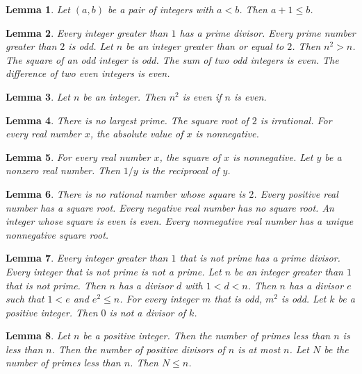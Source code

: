 \documentclass{article}
\newtheorem{lemma}{Lemma}
\begin{document}
\begin{lemma}\label{pair}
Let $(a,b)$ be a pair of integers with $a<b$. Then $a+1\le b$.
\end{lemma}

\begin{lemma}\label{comparatives-and-sums}
Every integer greater than $1$ has a prime divisor. Every prime number greater than $2$ is odd. Let $n$ be an integer greater than or equal to $2$. Then $n^2>n$. The square of an odd integer is odd. The sum of two odd integers is even. The difference of two even integers is even.
\end{lemma}

\begin{lemma}\label{postposed-if}
Let $n$ be an integer. Then $n^2$ is even if $n$ is even.
\end{lemma}

\begin{lemma}\label{no-largest}
There is no largest prime. The square root of $2$ is irrational. For every real number $x$, the absolute value of $x$ is nonnegative.
\end{lemma}

\begin{lemma}\label{square-reciprocal}
For every real number $x$, the square of $x$ is nonnegative. Let $y$ be a nonzero real number. Then $1/y$ is the reciprocal of $y$.
\end{lemma}

\begin{lemma}\label{square-roots}
There is no rational number whose square is $2$. Every positive real number has a square root. Every negative real number has no square root. An integer whose square is even is even. Every nonnegative real number has a unique nonnegative square root.
\end{lemma}

\begin{lemma}\label{relative-clauses}
Every integer greater than $1$ that is not prime has a prime divisor. Every integer that is not prime is not a prime. Let $n$ be an integer greater than $1$ that is not prime. Then $n$ has a divisor $d$ with $1<d<n$. Then $n$ has a divisor $e$ such that $1<e$ and $e^2\le n$. For every integer $m$ that is odd, $m^2$ is odd. Let $k$ be a positive integer. Then $0$ is not a divisor of $k$.
\end{lemma}

\begin{lemma}\label{numbers-of-objects}
Let $n$ be a positive integer. Then the number of primes less than $n$ is less than $n$. Then the number of positive divisors of $n$ is at most $n$. Let $N$ be the number of primes less than $n$. Then $N\le n$.
\end{lemma}
\end{document}
